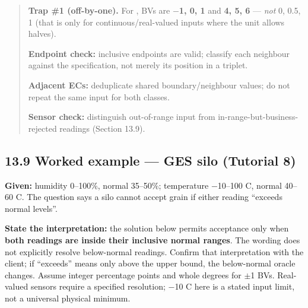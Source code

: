 \begin{studycolumns}
\vspace{0pt}


\begin{quote}\small\color{navy}
\textbf{Trap \#1 (off-by-one).} For , BVs are \textbf{\ensuremath{-}1, 0, 1} and \textbf{4, 5, 6} --- \emph{not} 0, 0.5, 1 (that is only for continuous/\allowbreak{}real-valued inputs where the unit allows halves).


\textbf{Endpoint check:} inclusive endpoints are valid; classify each neighbour against the specification, not merely its position in a triplet.

\textbf{Adjacent ECs:} deduplicate shared boundary/neighbour values; do not repeat the same input for both classes.


\textbf{Sensor check:} distinguish out-of-range input from in-range-but-business-rejected readings (Section 13.9).

\end{quote}
\subsection*{13.9 Worked example --- GES silo (Tutorial 8)}
\textbf{Given:} humidity 0--100\%, normal 35--50\%; temperature \ensuremath{-}10--100 \textdegree{}C, normal 40--60 \textdegree{}C. The question says a silo cannot accept grain if either reading ``exceeds normal levels''.

\textbf{State the interpretation:} the solution below permits acceptance only when \textbf{both readings are inside their inclusive normal ranges}. The wording does not explicitly resolve below-normal readings. Confirm that interpretation with the client; if ``exceeds'' means only above the upper bound, the below-normal oracle changes. Assume integer percentage points and whole degrees for \ensuremath{\pm}1 BVs. Real-valued sensors require a specified resolution; \ensuremath{-}10 \textdegree{}C here is a stated input limit, not a universal physical minimum.
\end{studycolumns}


